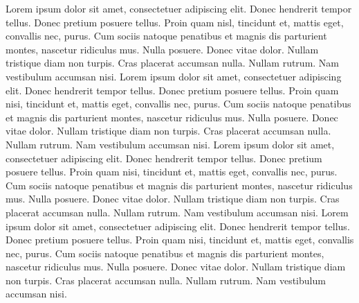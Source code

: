 \documentclass{book}
\begin{document}
Lorem ipsum dolor sit amet, consectetuer adipiscing elit. Donec hendrerit tempor tellus. Donec pretium posuere tellus. Proin quam nisl, tincidunt et, mattis eget, convallis nec, purus. Cum sociis natoque penatibus et magnis dis parturient montes, nascetur ridiculus mus. Nulla posuere. Donec vitae dolor. Nullam tristique diam non turpis. Cras placerat accumsan nulla. Nullam rutrum. Nam vestibulum accumsan nisi.  Lorem ipsum dolor sit amet, consectetuer adipiscing elit. Donec hendrerit tempor tellus. Donec pretium posuere tellus. Proin quam nisi, tincidunt et, mattis eget, convallis nec, purus. Cum sociis natoque penatibus et magnis dis parturient montes, nascetur ridiculus mus. Nulla posuere. Donec vitae dolor. Nullam tristique diam non turpis. Cras placerat accumsan nulla. Nullam rutrum. Nam vestibulum accumsan nisi.  Lorem ipsum dolor sit amet, consectetuer adipiscing elit. Donec hendrerit tempor tellus. Donec pretium posuere tellus. Proin quam nisi, tincidunt et, mattis eget, convallis nec, purus. Cum sociis natoque penatibus et magnis dis parturient montes, nascetur ridiculus mus. Nulla posuere. Donec vitae dolor. Nullam tristique diam non turpis. Cras placerat accumsan nulla. Nullam rutrum. Nam vestibulum accumsan nisi.   Lorem ipsum dolor sit amet, consectetuer adipiscing elit. Donec hendrerit tempor tellus. Donec pretium posuere tellus. Proin quam nisi, tincidunt et, mattis eget, convallis nec, purus. Cum sociis natoque penatibus et magnis dis parturient montes, nascetur ridiculus mus. Nulla posuere. Donec vitae dolor. Nullam tristique diam non turpis. Cras placerat accumsan nulla. Nullam rutrum. Nam vestibulum accumsan nisi.
\end{document}
